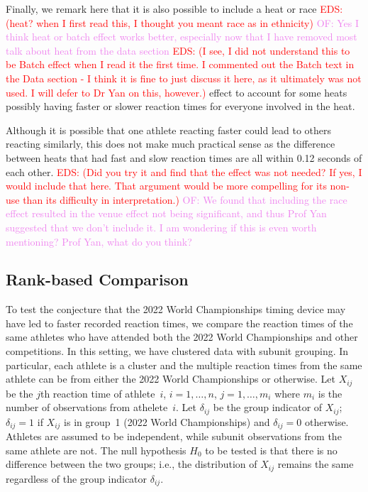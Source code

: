 \documentclass[12pt, letterpaper, titlepage]{article}
\newcommand{\eds}[1]{\textcolor{red}{EDS: (#1)}}
\newcommand{\of}[1]{\textcolor{violet}{OF: #1}}
\begin{document}
Finally, we remark here that it is also possible to include a heat or race 
\eds{heat? when I first read this, I thought you meant race as in ethnicity}
\of{Yes I think heat or batch effect works better, especially now that I have
removed most talk about heat from the data section} 
\eds{I see, I did not understand this to be Batch effect when I read it the 
first time.  I commented out the Batch text in the Data section - I think it is 
fine to just discuss it here, as it ultimately was not used.  I will defer to 
Dr Yan on this, however.}
effect to account for some heats possibly having faster or slower 
reaction times for everyone involved in the heat.

Although it is possible that one athlete reacting faster could lead to others reacting
similarly, this does not make much practical sense as the difference between
heats that had fast and slow reaction times are all within 0.12 seconds of each
other. 
\eds{Did you try it and find that the effect was not needed?  If yes,
I would include that here.  That argument 
would be more compelling for its non-use than its difficulty in interpretation.}
\of{We found that including the race effect resulted in the venue effect not
being significant, and thus Prof Yan suggested that we don't include it.  I am
wondering if this is even worth mentioning? Prof Yan, what do you think?} 


\subsection{Rank-based Comparison}\label{sec:rank}


To test the conjecture that the 2022 World Championships timing device may have 
led to faster recorded reaction times, we compare the reaction times of the same
athletes who have attended both the 2022 World Championships and other 
competitions. 
In this setting, we have clustered data with subunit grouping. In particular,
each athlete is a cluster and the multiple reaction times from the same athlete
can be from either the 2022 World Championships or otherwise.
Let $X_{ij}$ be the $j$th reaction time of athlete~$i$, $i = 1, \ldots, n$,
$j = 1, \ldots, m_i$ where $m_i$ is the number of observations from
athelete~$i$. Let $\delta_{ij}$ be the group indicator of $X_{ij}$; $\delta_{ij}
= 1$ if $X_{ij}$ is in group~1 (2022 World Championships) and $\delta_{ij} = 0$ 
otherwise. Athletes are
assumed to be independent, while subunit observations from the same athlete are
not. The null hypothesis $H_0$ to be tested is that there is no difference
between the two groups; i.e., the distribution of $X_{ij}$ remains the same
regardless of the group indicator $\delta_{ij}$.
\end{document}
